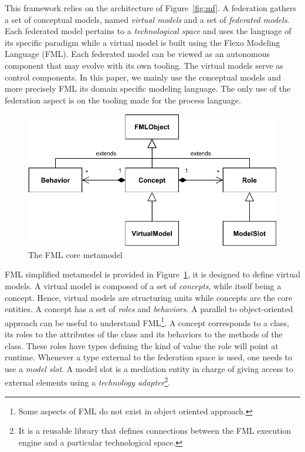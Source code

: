 This framework relies on the architecture of Figure~\ref{fig:mf}. A federation
gathers a set of conceptual models, named \emph{virtual models} and a
set of \emph{federated models}. Each federated model pertains to a
\emph{technological space} and uses the language of its specific
paradigm while a virtual model is built using the Flexo Modeling
Language (FML). Each federated model can be viewed as an autonomous
component that may evolve with its own tooling. The virtual models
serve as control components.
In this paper, we mainly use the conceptual models and more precisely FML its domain specific modeling language. The only use of the federation aspect is on the tooling made for the process language.

\begin{figure}[t]
    \centering
    \includegraphics[width=\columnwidth]{Figures/FMLCoreModel.pdf}
    \caption{The FML core metamodel}
    \label{fig:mm}
\end{figure}

FML simplified metamodel is provided in Figure~\ref{fig:mm}, it is designed to define virtual models. A virtual model
is composed of a set of \emph{concepts}, while itself being a concept.
Hence, virtual models are structuring units while concepts are the
core entities. A concept has a set of \emph{roles} and
\emph{behaviors}. A parallel to object-oriented approach can be useful
to understand FML\footnote{Some aspects of FML do not exist in object oriented approach.}. A concept corresponds to a class, its roles to the
attributes of the class and its behaviors to the methods of the class.
These roles have types defining the kind of value the role will point
at runtime.
Whenever a type external to the federation space is used, one needs to use a \emph{model slot}. A model
slot is a mediation entity in charge of giving
access to external elements using
a \emph{technology adapter}\footnote{It is a reusable library that defines
connections between the FML execution engine and a particular
technological space.}.

